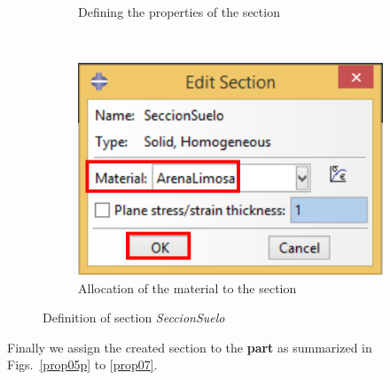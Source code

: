 \begin{figure}[!h]
\begin{subfigure}[!h]{0.39\textwidth}
    \caption{Defining the properties of the section}
    \label{prop04}
  \end{subfigure}%
  ~ %
  \begin{subfigure}[!h]{0.39\textwidth}
    \includegraphics[width=\textwidth]{./body/images/prop05.pdf}
    \caption{Allocation of the material to the section}
    \label{prop05}
  \end{subfigure}%
  \caption{Definition of section \textit{SeccionSuelo}}
\end{figure}

Finally we assign the created section to the \textbf{part} as
summarized in Figs.~\ref{prop05p} to \ref{prop07}.

